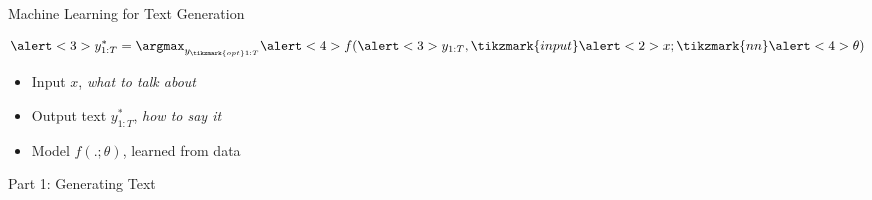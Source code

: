 \begin{frame}{Machine Learning for Text Generation}

  \[ \alert<3>{y^*_{1:T}} = \argmax_{y_{\tikzmark{opt}1:T}} \alert<4>{f}(\alert<3>{y_{1:T}}, \tikzmark{input}\alert<2>{x}; \tikzmark{nn}\alert<4>{\theta}) \]



  \begin{itemize}
    \pause
  \item Input \alert<2>{$x$},  \textit{what to talk about}
    \air
    \pause
  \item Output text \alert<3>{$y^*_{1:T}$}, \textit{how to say it}
    \air
    \pause
  \item Model \alert<4>{$f(.; \theta)$}, learned from data
  \end{itemize}
\end{frame}


\begin{frame}{Part 1: Generating Text}
  \begin{center}
  \end{center}
\end{frame}


